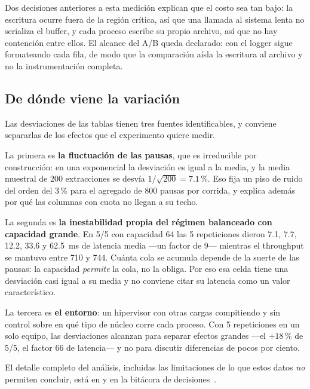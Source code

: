 Dos decisiones anteriores a esta medición explican que el costo sea tan
bajo: la escritura ocurre fuera de la región crítica, así que una llamada al
sistema lenta no serializa el buffer, y cada proceso escribe su propio
archivo, así que no hay contención entre ellos. El alcance del A/B queda
declarado: con  el logger sigue formateando cada fila, de
modo que la comparación aísla la escritura al archivo y no la
instrumentación completa.

\subsection{De dónde viene la variación}

Las desviaciones de las tablas tienen tres fuentes identificables, y
conviene separarlas de los efectos que el experimento quiere medir.

La primera es \textbf{la fluctuación de las pausas}, que es irreducible por
construcción: en una exponencial la desviación es igual a la media, y la
media muestral de 200 extracciones se desvía $1/\sqrt{200} = 7.1$\,\%. Eso
fija un piso de ruido del orden del 3\,\% para el agregado de 800 pausas por
corrida, y explica además por qué las columnas con cuota no llegan a su
techo.

La segunda es \textbf{la inestabilidad propia del régimen balanceado con
capacidad grande}. En 5/5 con capacidad 64 las 5 repeticiones dieron 7.1,
7.7, 12.2, 33.6 y 62.5~ms de latencia media ---un factor de 9--- mientras el
throughput se mantuvo entre 710 y 744. Cuánta cola se acumula depende de la
suerte de las pausas: la capacidad \emph{permite} la cola, no la obliga. Por
eso esa celda tiene una desviación casi igual a su media y no conviene citar
su latencia como un valor característico.

La tercera es \textbf{el entorno}: un hipervisor con otras cargas
compitiendo y sin control sobre en qué tipo de núcleo corre cada proceso.
Con 5 repeticiones en un solo equipo, las desviaciones alcanzan para separar
efectos grandes ---el $+18$\,\% de 5/5, el factor 66 de latencia--- y no
para discutir diferencias de pocos por ciento.

El detalle completo del análisis, incluidas las limitaciones de lo que estos
datos \emph{no} permiten concluir, está en
 y en la bitácora de
decisiones~\cite{Bitacora2026}.
